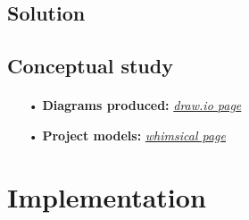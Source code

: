 
\subsection{Solution}
\begin{frame}[fragile=singleslide]{\insertsectionhead}
  \framesubtitle{\insertsubsectionhead}
  \begin{figure}[b]
  \end{figure}
\end{frame}


\subsection{Conceptual study}
\begin{frame}[fragile=singleslide]{\insertsectionhead}
  \framesubtitle{\insertsubsectionhead}
  \begin{itemize}
    \item[•] \textbf{Diagrams produced:} \href{https://viewer.diagrams.net/?tags=&highlight=0000ff&edit=_blank&layers=1&nav=1&title=Diagram.drawio#Uhttps%3A%2F%2Fraw.githubusercontent.com%2Fabdorah%2Fstage2021%2Fmaster%2Fdiagramms%2FDiagram.drawio}{\textit{draw.io page}}
		\item[•] \textbf{Project models:} \href{https://whimsical.com/kdi-ux-design-J9PD866564ibwyMBwLHN9N}{\textit{whimsical page}}
  \end{itemize}
\end{frame}

\section{Implementation}

